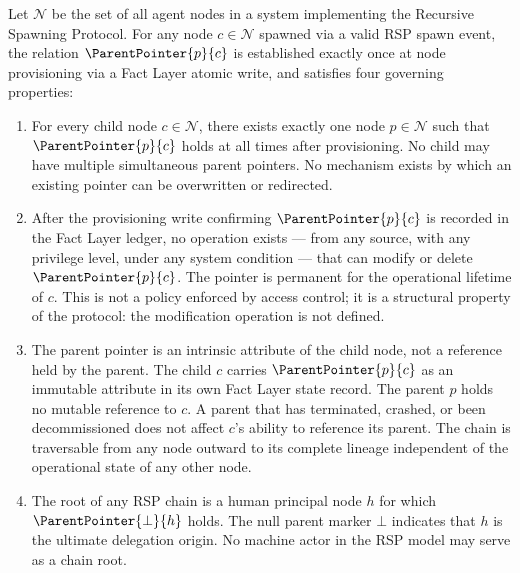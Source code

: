 \begin{definition}[ParentPointer]
\label{def:parent-pointer}
Let $\mathcal{N}$ be the set of all agent nodes in a \bxthree{} system implementing the Recursive Spawning Protocol. For any node $c \in \mathcal{N}$ spawned via a valid RSP spawn event, the relation $\ParentPointer{p}{c}$ is established exactly once at node provisioning via a Fact Layer atomic write, and satisfies four governing properties:

\begin{enumerate}
    \item[(P1) \textbf{Uniqueness}] For every child node $c \in \mathcal{N}$, there exists exactly one node $p \in \mathcal{N}$ such that $\ParentPointer{p}{c}$ holds at all times after provisioning. No child may have multiple simultaneous parent pointers. No mechanism exists by which an existing pointer can be overwritten or redirected.

    \item[(P2) \textbf{Immutability}] After the provisioning write confirming $\ParentPointer{p}{c}$ is recorded in the Fact Layer ledger, no operation exists --- from any source, with any privilege level, under any system condition --- that can modify or delete $\ParentPointer{p}{c}$. The pointer is permanent for the operational lifetime of $c$. This is not a policy enforced by access control; it is a structural property of the protocol: the modification operation is not defined.

    \item[(P3) \textbf{Directionality}] The parent pointer is an intrinsic attribute of the child node, not a reference held by the parent. The child $c$ carries $\ParentPointer{p}{c}$ as an immutable attribute in its own Fact Layer state record. The parent $p$ holds no mutable reference to $c$. A parent that has terminated, crashed, or been decommissioned does not affect $c$'s ability to reference its parent. The chain is traversable from any node outward to its complete lineage independent of the operational state of any other node.

    \item[(P4) \textbf{Human Anchor Termination}] The root of any RSP chain is a human principal node $h$ for which $\ParentPointer{\bot}{h}$ holds. The null parent marker $\bot$ indicates that $h$ is the ultimate delegation origin. No machine actor in the RSP model may serve as a chain root.
\end{enumerate}
\end{definition}

